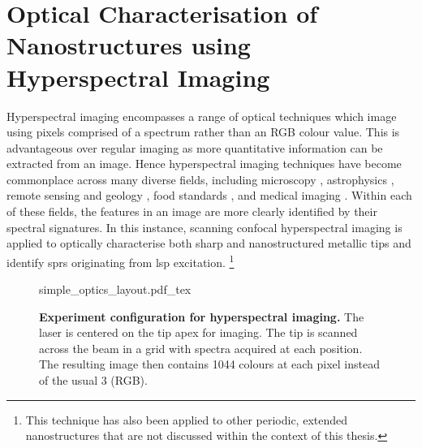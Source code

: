 \documentclass{article}
\begin{document}
\section{Optical Characterisation of Nanostructures using Hyperspectral Imaging}
\label{sec:hyperspectral_imaging}

Hyperspectral imaging encompasses a range of optical techniques which image using pixels comprised of a spectrum rather than an RGB colour value. This is advantageous over regular imaging as more quantitative information can be extracted from an image. Hence hyperspectral imaging techniques have become commonplace across many diverse fields, including microscopy \cite{schultz2001hyperspectral, leavesley2012hyperspectral}, astrophysics \cite{hege2004hyperspectral}, remote sensing and geology \cite{hackwell1996lwir, shaw2003spectral}, food standards \cite{kim2001hyperspectral, gowen2007hyperspectral}, and medical imaging \cite{vo2004hyperspectral, martin2006development, lu2014medical}. Within each of these fields, the features in an image are more clearly identified by their spectral signatures. In this instance, scanning confocal hyperspectral imaging is applied to optically characterise both sharp and nanostructured metallic tips and identify \glspl{spr} originating from \gls{lsp} excitation.%
\footnote{This technique has also been applied to other periodic, extended nanostructures that are not discussed within the context of this thesis.} %

\begin{figure}[bt]
\centering
\fontsize{10pt}{1em}\selectfont
\def\svgwidth{0.6\textwidth}
{simple_optics_layout.pdf_tex}
\caption[Experiment configuration for hyperspectral imaging]{\textbf{Experiment configuration for hyperspectral imaging.} The laser is centered on the tip apex for imaging. The tip is scanned across the beam in a grid with spectra acquired at each position. The resulting image then contains 1044 colours at each pixel instead of the usual 3 (RGB).}
\label{fig:simple_optics_layout}
\end{figure}
\end{document}
